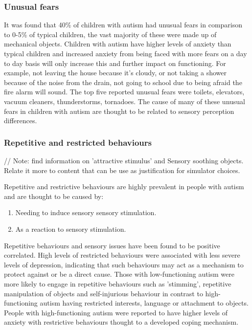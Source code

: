 \documentclass[11pt]{report}
\begin{document}
\subsubsection{Unusual fears}
It was found that 40\% of children with autism had unusual fears in comparison to 0-5\% of typical children, the vast majority of these were made up of mechanical objects. Children with autism have higher levels of anxiety than typical children\cite{fears} and increased anxiety from being faced with more fears on a day to day basis will only increase this and further impact on functioning. For example, not leaving the house because it's cloudy, or not taking a shower because of the noise from the drain, not going to school due to being afraid the fire alarm will sound. The top five reported unusual fears were toilets, elevators, vacuum cleaners, thunderstorms, tornadoes. The cause of many of these unusual fears in children with autism are thought to be related to sensory perception differences\cite{fears}.

\subsubsection{Repetitive and restricted behaviours}

// Note: find information on 'attractive stimulus' and Sensory soothing objects. Relate it more to content that can be use as justification for simulator choices.

Repetitive and restrictive behaviours are highly prevalent in people with autism and are thought to be caused by:
\begin{enumerate}
\item Needing to induce sensory sensory stimulation\cite{rrsyouth}.
\item As a reaction to sensory stimulation\cite{rrsyouth}.
\end{enumerate}

Repetitive behaviours and sensory issues have been found to be positive correlated\cite{rrs_sensory}\cite{rssyouth}. High levels of restricted behaviours were associated with less severe levels of depression, indicating that such behaviours may act as a mechanism to protect against or be a direct cause\cite{rss_ensory}. Those with low-functioning autism were more likely to engage in repetitive behaviours such as 'stimming', repetitive manipulation of objects and self-injurious behaviour in contrast to high-functioning autism having restricted interests, language or attachment to objects\cite{rss_sensory}. People with high-functioning autism were reported to have higher levels of anxiety with restrictive behaviours thought to a developed coping mechanism\cite{rssyouth}.
\end{document}
